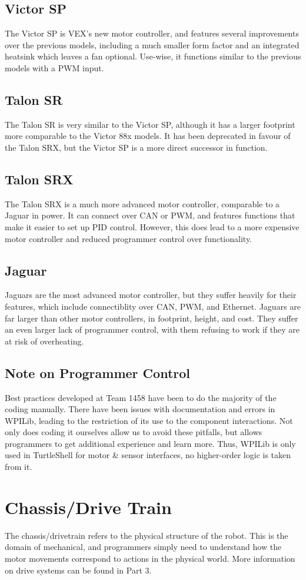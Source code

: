 \documentclass[]{report}
\begin{document}
\subsection{Victor SP}
	The Victor SP is VEX's new motor controller, and features several improvements over the previous models, including a much smaller form factor and an integrated heatsink which leaves a fan optional.
	Use-wise, it functions similar to the previous models with a PWM input.
\subsection{Talon SR}
	The Talon SR is very similar to the Victor SP, although it has a larger footprint more comparable to the Victor 88x models.
	It has been deprecated in favour of the Talon SRX, but the Victor SP is a more direct successor in function.
\subsection{Talon SRX}
	The Talon SRX is a much more advanced motor controller, comparable to a Jaguar in power.
	It can connect over CAN or PWM, and features functions that make it easier to set up PID control.
	However, this does lead to a more expensive motor controller and reduced programmer control over functionality.
\subsection{Jaguar}
	Jaguars are the most advanced motor controller, but they suffer heavily for their features, which include connectiblity over CAN, PWM, and Ethernet.
	Jaguars are far larger than other motor controllers, in footprint, height, and cost.
	They suffer an even larger lack of programmer control, with them refusing to work if they are at risk of overheating.
\subsection{Note on Programmer Control}
	Best practices developed at Team 1458 have been to do the majority of the coding manually.
	There have been issues with documentation and errors in WPILib, leading to the restriction of its use to the component interactions.
	Not only does coding it ourselves allow us to avoid these pitfalls, but allows programmers to get additional experience and learn more.
	Thus, WPILib is only used in TurtleShell for motor \& sensor interfaces, no higher-order logic is taken from it.
\section{Chassis/Drive Train}
The chassis/drivetrain refers to the physical structure of the robot. This is the domain of mechanical, and programmers simply need to understand how the motor movements correspond to actions in the physical world. More information on drive systems can be found in Part 3.
\end{document}
